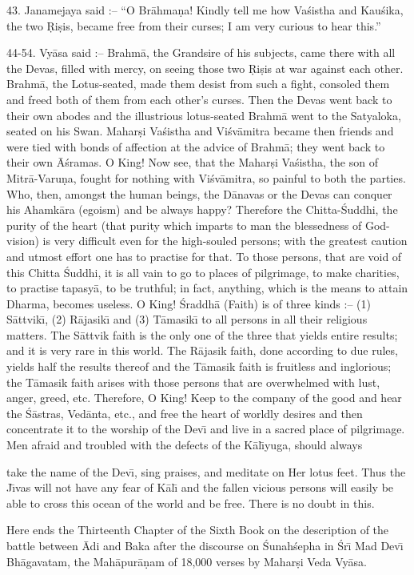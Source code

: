 43. Janamejaya said :-- ``O Br\=ahma\d{n}a! Kindly tell me how Va\'sistha and Kau\'sika, the two \d{R}i\d{s}is, became free from their curses; I am very curious to hear this.''

44-54. Vy\=asa said :-- Brahm\=a, the Grandsire of his subjects, came there with all the Devas, filled with mercy, on seeing those two \d{R}i\d{s}is at war against each other. Brahm\=a, the Lotus-seated, made them desist from such a fight, consoled them and freed both of them from each other's curses. Then the Devas went back to their own abodes and the illustrious lotus-seated Brahm\=a went to the Satyaloka, seated on his Swan. Mahar\d{s}i Va\'sistha and Vi\'sv\=amitra became then friends and were tied with bonds of affection at the advice of Brahm\=a; they went back to their own \=A\'sramas. O King! Now see, that the Mahar\d{s}i Va\'sistha, the son of Mitr\=a-Varu\d{n}a, fought for nothing with Vi\'sv\=amitra, so painful to both the parties. Who, then, amongst the human beings, the D\=anavas or the Devas can conquer his Ahamk\=ara (egoism) and be always happy? Therefore the Chitta-\'Suddhi, the purity of the heart (that purity which imparts to man the blessedness of God-vision) is very difficult even for the high-souled persons; with the greatest caution and utmost effort one has to practise for that. To those persons, that are void of this Chitta \'Suddhi, it is all vain to go to places of pilgrimage, to make charities, to practise tapasy\=a, to be truthful; in fact, anything, which is the means to attain Dharma, becomes useless. O King! \'Sraddh\=a (Faith) is of three kinds :-- (1) S\=attvik\={\i}, (2) R\=ajasik\={\i} and (3) T\=amasik\={\i} to all persons in all their religious matters. The S\=attvik faith is the only one of the three that yields entire results; and it is very rare in this world. The R\=ajasik faith, done according to due rules, yields half the results thereof and the T\=amasik faith is fruitless and inglorious; the T\=amasik faith arises with those persons that are overwhelmed with lust, anger, greed, etc. Therefore, O King! Keep to the company of the good and hear the \'S\=astras, Ved\=anta, etc., and free the heart of worldly desires and then concentrate it to the worship of the Dev\={\i} and live in a sacred place of pilgrimage. Men afraid and troubled with the defects of the K\=al\={\i}yuga, should always

take the name of the Dev\={\i}, sing praises, and meditate on Her lotus feet. Thus the J\={\i}vas will not have any fear of K\=al\={\i} and the fallen vicious persons will easily be able to cross this ocean of the world and be free. There is no doubt in this.

Here ends the Thirteenth Chapter of the Sixth Book on the description of the battle between \=Adi and Baka after the discourse on \'Sunah\'sepha in \'Sr\={\i} Mad Dev\={\i} Bh\=agavatam, the Mah\=apur\=a\d{n}am of 18,000 verses by Mahar\d{s}i Veda Vy\=asa.



